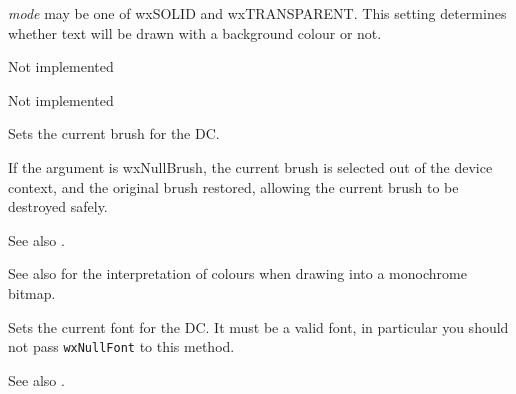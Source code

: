 \label{wxdcsetbackgroundmode}


{\it mode} may be one of wxSOLID and wxTRANSPARENT. This setting determines
whether text will be drawn with a background colour or not.

\label{wxdcsetclippingregion}





Not implemented 


\label{wxdcsetpalette}


Not implemented 

\label{wxdcsetbrush}


Sets the current brush for the DC.

If the argument is wxNullBrush, the current brush is selected out of the device
context, and the original brush restored, allowing the current brush to
be destroyed safely.

See also .

See also  for the interpretation of colours
when drawing into a monochrome bitmap.

\label{wxdcsetfont}


Sets the current font for the DC. It must be a valid font, in particular you
should not pass {\tt wxNullFont} to this method.

See also .

\label{wxdcsetlogicalfunction}

